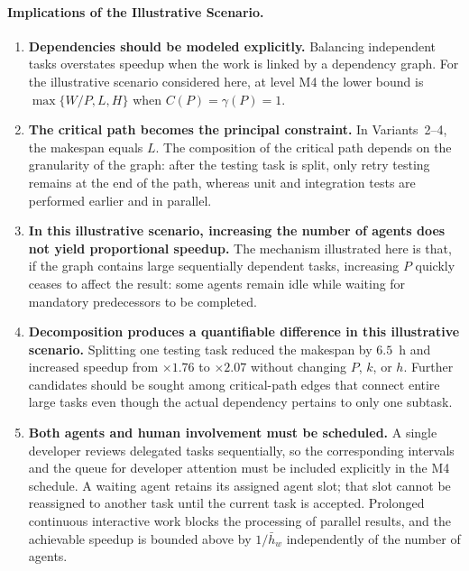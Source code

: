 \paragraph{Implications of the Illustrative Scenario.}
\begin{enumerate}
  \item \textbf{Dependencies should be modeled explicitly.} Balancing
  independent tasks overstates speedup when the work is linked by a dependency
  graph. For the illustrative scenario considered here, at level M4 the lower
  bound is $\max\{W/P, L, H\}$ when $C(P) = \gamma(P) = 1$.

  \item \textbf{The critical path becomes the principal constraint.} In
  Variants~2--4, the makespan equals $L$. The composition of the critical path
  depends on the granularity of the graph: after the testing task is split,
  only retry testing remains at the end of the path, whereas unit and
  integration tests are performed earlier and in parallel.

  \item \textbf{In this illustrative scenario, increasing the number of agents
  does not yield proportional speedup.} The mechanism illustrated here is that,
  if the graph contains large sequentially dependent tasks, increasing $P$
  quickly ceases to affect the result: some agents remain idle while waiting
  for mandatory predecessors to be completed.

  \item \textbf{Decomposition produces a quantifiable difference in this
  illustrative scenario.} Splitting one testing task reduced the makespan by
  $6.5$~h and increased speedup from $\times 1.76$ to $\times 2.07$ without
  changing $P$, $k$, or $h$. Further candidates should be sought among
  critical-path edges that connect entire large tasks even though the actual
  dependency pertains to only one subtask.

  \item \textbf{Both agents and human involvement must be scheduled.} A single
  developer reviews delegated tasks sequentially, so the corresponding
  intervals and the queue for developer attention must be included explicitly
  in the M4 schedule. A waiting agent retains its assigned agent slot; that
  slot cannot be reassigned to another task until the current task is accepted.
  Prolonged continuous interactive work blocks the processing of parallel
  results, and the achievable speedup is bounded above by $1/\bar{h}_w$
  independently of the number of agents.
\end{enumerate}

\ifdefined\FULLARTICLE
  \let\finishdocument\relax
\else
  \def\finishdocument{}
\fi
\finishdocument
